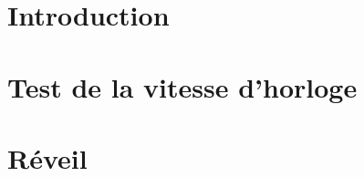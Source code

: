 

\usepackage{lipsum}




\newpage
{} %

\section{Introduction}


\section{Test de la vitesse d'horloge}


\section{Réveil}



